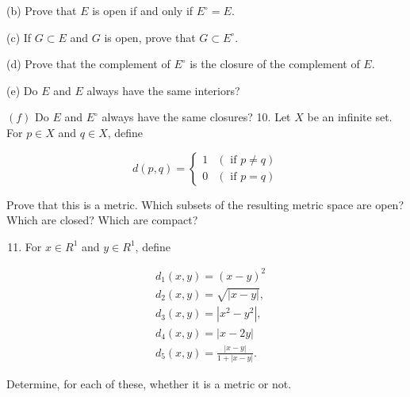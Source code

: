 \documentclass[10pt]{article}
\begin{document}
(b) Prove that $E$ is open if and only if $E^{\circ}=E$.

(c) If $G \subset E$ and $G$ is open, prove that $G \subset E^{\circ}$.

(d) Prove that the complement of $E^{\circ}$ is the closure of the complement of $E$.

(e) Do $E$ and $E$ always have the same interiors?

$(f)$ Do $E$ and $E^{\circ}$ always have the same closures? 10. Let $X$ be an infinite set. For $p \in X$ and $q \in X$, define

$$
d(p, q)= \begin{cases}1 & (\text { if } p \neq q) \\ 0 & (\text { if } p=q)\end{cases}
$$

Prove that this is a metric. Which subsets of the resulting metric space are open? Which are closed? Which are compact?

\begin{enumerate}
  \setcounter{enumi}{10}
  \item For $x \in R^{1}$ and $y \in R^{1}$, define
\end{enumerate}

$$
\begin{aligned}
& d_{1}(x, y)=(x-y)^{2} \\
& d_{2}(x, y)=\sqrt{|x-y|}, \\
& d_{3}(x, y)=\left|x^{2}-y^{2}\right|, \\
& d_{4}(x, y)=|x-2 y| \\
& d_{5}(x, y)=\frac{|x-y|}{1+|x-y|} .
\end{aligned}
$$

Determine, for each of these, whether it is a metric or not.
\end{document}

